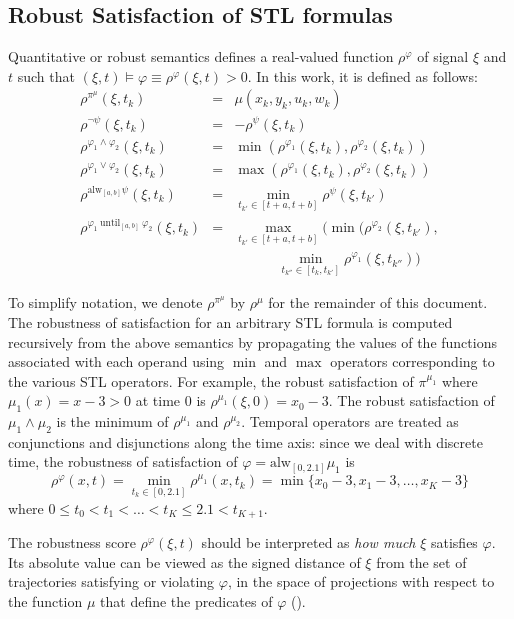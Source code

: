 \documentclass[hyperref, xcolor=dvipsnames, 10pt]{article} %
\def \r {\rho}
\def \f {\varphi}
\def\G {\text{alw}}
\def\until {\text{until}}
\begin{document}
\subsection{Robust Satisfaction of STL formulas}\label{robust_defn}

Quantitative or robust semantics defines a real-valued function $\r^\f$ of signal $\xi$ and $t$ such
that $(\xi,t) \models \f \equiv \r^\f(\xi,t) > 0$. In this work, it is defined as follows:
\[
\begin{array}{lll}
\r^{\pi^\mu}(\xi,t_k)&=& \mu(x_k,y_k,u_k,w_k)\\
\r^{\neg \psi}(\xi,t_k)&=&  -\r^\psi(\xi, t_k) \\
\r^{\f_1 \land \f_2}(\xi,t_k)&=& \min (\r^{\f_1}(\xi,t_k),\r^{\f_2}(\xi,t_k)    )\\
\r^{\f_1 \lor \f_2}(\xi,t_k)&=& \max (\r^{\f_1}(\xi,t_k),\r^{\f_2}(\xi,t_k)    )\\
\r^{\G_{[a,b]} \psi}(\xi,t_k)&=& \min_{t_{k'}\in [t+a, t+b]}\r^{\psi}(\xi,t_{k'})\\
\r^{\f_1~\until_{[a,b]}~\f_2}(\xi,t_k)&=&  \max_{t_{k'}\in [t+a, t+b]} ( \min (\r^{\f_2}(\xi,t_{k'}),    \\
&&~~~~~~~~~~~~~~\min_{t_{k''} \in [t_k,t_{k'}]} \r^{\f_1}(\xi,t_{k''}))
\end{array}
\]

To simplify notation, we denote $\r^{\pi^\mu}$ by $\r^{\mu}$ for the remainder of this document. The
robustness of satisfaction for an arbitrary STL formula is computed recursively from the above
semantics by propagating the values of the functions associated with
each operand using $\min$ and $\max$ operators corresponding to the various STL operators. For
example, the robust satisfaction of $\pi^{\mu_1}$ where $\mu_1(x) = x-3>0$ at time $0$ is
$\r^{\mu_1}(\xi,0) = x_0-3$. The robust satisfaction of $\mu_1 \wedge \mu_2$ is the minimum of
$\r^{\mu_1}$ and $\r^{\mu_2}$. Temporal operators are treated as conjunctions and disjunctions along
the time axis: since we deal with discrete time, the robustness of satisfaction of
$\f= \G_{[0,2.1]} \mu_1$ is
$$\r^\f(x,t)= \min_{t_k \in [0,2.1]} \r^{\mu_1}(x,t_k)= \min \{x_0-3, x_1-3, \hdots, x_K-3\}$$ 
  where  $0 \leq t_0 < t_1 < \hdots < t_K \leq 2.1 < t_{K+1} $.

  The robustness score $\r^\f(\xi,t)$ should be interpreted as \emph{how much} $\xi$ satisfies
  $\f$. Its absolute value can be viewed as the signed distance of $\xi$ from the set of trajectories
  satisfying or violating $\f$, in the space of projections with respect to the function $\mu$ that
  define the predicates of $\f$ (\cite{FainekosP09}).
\end{document}
